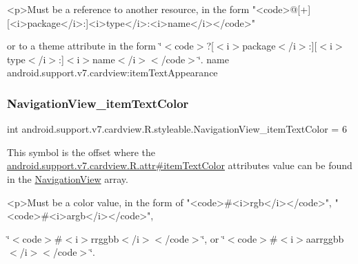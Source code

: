 \begin{DoxyVerb}      <p>Must be a reference to another resource, in the form "<code>@[+][<i>package</i>:]<i>type</i>:<i>name</i></code>"
\end{DoxyVerb}
 or to a theme attribute in the form \char`\"{}$<$code$>$?\mbox{[}$<$i$>$package$<$/i$>$\+:\mbox{]}\mbox{[}$<$i$>$type$<$/i$>$\+:\mbox{]}$<$i$>$name$<$/i$>$$<$/code$>$\char`\"{}.  name android.\+support.\+v7.\+cardview\+:item\+Text\+Appearance \mbox{\label{classandroid_1_1support_1_1v7_1_1cardview_1_1R_1_1styleable_a10b9b8647ec9aacfbf3271aef75b99a4}} 
\subsubsection{\texorpdfstring{Navigation\+View\+\_\+item\+Text\+Color}{NavigationView\_itemTextColor}}
{\footnotesize\ttfamily int android.\+support.\+v7.\+cardview.\+R.\+styleable.\+Navigation\+View\+\_\+item\+Text\+Color = 6\hspace{0.3cm}{\ttfamily [static]}}

This symbol is the offset where the \hyperlink{classandroid_1_1support_1_1v7_1_1cardview_1_1R_1_1attr_a178b859ac1d854093896f5a61d0f5dbf}{android.\+support.\+v7.\+cardview.\+R.\+attr\#item\+Text\+Color} attribute\textquotesingle{}s value can be found in the \hyperlink{classandroid_1_1support_1_1v7_1_1cardview_1_1R_1_1styleable_aab4216e563b2e19093e1d57494734202}{Navigation\+View} array.

\begin{DoxyVerb}      <p>Must be a color value, in the form of "<code>#<i>rgb</i></code>", "<code>#<i>argb</i></code>",
\end{DoxyVerb}
 \char`\"{}$<$code$>$\#$<$i$>$rrggbb$<$/i$>$$<$/code$>$\char`\"{}, or \char`\"{}$<$code$>$\#$<$i$>$aarrggbb$<$/i$>$$<$/code$>$\char`\"{}. 

